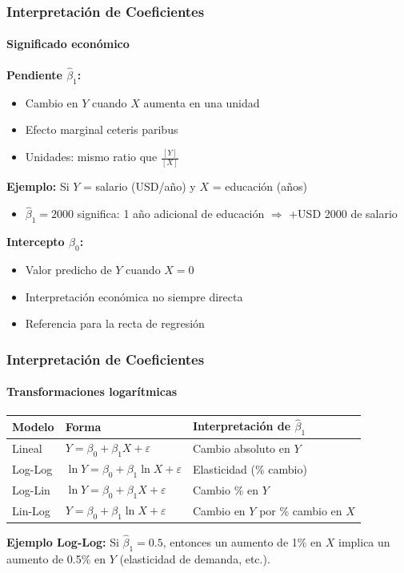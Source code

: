 \documentclass[aspectratio=169,11pt]{beamer}
\begin{document}
\begin{frame}
\frametitle{Interpretación de Coeficientes}
\framesubtitle{Significado económico}

\small
\textbf{Pendiente $\hat{\beta}_1$:}
\setlength{\itemsep}{2pt}
\begin{itemize}
    \item Cambio en $Y$ cuando $X$ aumenta en una unidad
    \item Efecto marginal ceteris paribus
    \item Unidades: mismo ratio que $\frac{[Y]}{[X]}$
\end{itemize}

\vspace{0.4cm}
\textbf{Ejemplo:} Si $Y$ = salario (USD/año) y $X$ = educación (años)
\begin{itemize}
    \item $\hat{\beta}_1 = 2000$ significa: 1 año adicional de educación $\Rightarrow$ +USD 2000 de salario
\end{itemize}

\vspace{0.4cm}
\textbf{Intercepto $\hat{\beta}_0$:}
\begin{itemize}
    \item Valor predicho de $Y$ cuando $X = 0$
    \item Interpretación económica no siempre directa
    \item Referencia para la recta de regresión
\end{itemize}
\end{frame}

\begin{frame}
\frametitle{Interpretación de Coeficientes}
\framesubtitle{Transformaciones logarítmicas}

\small
\begin{tabular}{lll}
    \toprule
    \textbf{Modelo} & \textbf{Forma} & \textbf{Interpretación de $\hat{\beta}_1$} \\
    \midrule
    Lineal & $Y = \beta_0 + \beta_1 X + \varepsilon$ & Cambio absoluto en $Y$ \\
    Log-Log & $\ln Y = \beta_0 + \beta_1 \ln X + \varepsilon$ & Elasticidad (\% cambio) \\
    Log-Lin & $\ln Y = \beta_0 + \beta_1 X + \varepsilon$ & Cambio \% en $Y$ \\
    Lin-Log & $Y = \beta_0 + \beta_1 \ln X + \varepsilon$ & Cambio en $Y$ por \% cambio en $X$ \\
    \bottomrule
\end{tabular}

\vspace{0.6cm}
\small
\textbf{Ejemplo Log-Log:} Si $\hat{\beta}_1 = 0.5$, entonces un aumento de 1\% en $X$
implica un aumento de 0.5\% en $Y$ (elasticidad de demanda, etc.).
\end{frame}
\end{document}

